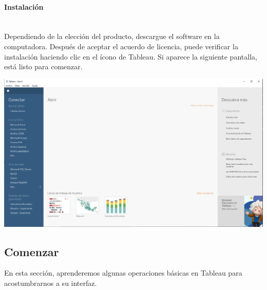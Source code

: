 \documentclass[12pt,letterpaper]{article}
\begin{document}
    \paragraph{\Large Instalación\\ \\}
    Dependiendo de la elección del producto, descargue el software en la computadora. Después de aceptar el acuerdo de licencia, puede verificar la instalación haciendo clic en el ícono de Tableau. Si aparece la siguiente pantalla, está listo para comenzar.
    \begin{center}
        \includegraphics[width=16cm]{./img/img1.png}
    \end{center}
    \subsection{Comenzar}
    En esta sección, aprenderemos algunas operaciones básicas en Tableau para acostumbrarnos a su interfaz.
\end{document}
